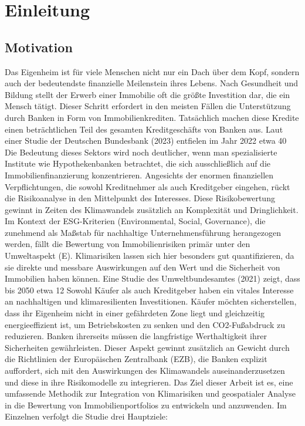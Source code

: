 \section{Einleitung}
\subsection{Motivation}

Das Eigenheim ist für viele Menschen nicht nur ein Dach über dem Kopf, sondern auch der bedeutendste finanzielle Meilenstein ihres Lebens. Nach Gesundheit und Bildung stellt der Erwerb einer Immobilie oft die größte Investition dar, die ein Mensch tätigt. Dieser Schritt erfordert in den meisten Fällen die Unterstützung durch Banken in Form von Immobilienkrediten. Tatsächlich machen diese Kredite einen beträchtlichen Teil des gesamten Kreditgeschäfts von Banken aus. Laut einer Studie der Deutschen Bundesbank (2023) entfielen im Jahr 2022 etwa 40%
Die Bedeutung dieses Sektors wird noch deutlicher, wenn man spezialisierte Institute wie Hypothekenbanken betrachtet, die sich ausschließlich auf die Immobilienfinanzierung konzentrieren. Angesichts der enormen finanziellen Verpflichtungen, die sowohl Kreditnehmer als auch Kreditgeber eingehen, rückt die Risikoanalyse in den Mittelpunkt des Interesses. Diese Risikobewertung gewinnt in Zeiten des Klimawandels zusätzlich an Komplexität und Dringlichkeit.
Im Kontext der ESG-Kriterien (Environmental, Social, Governance), die zunehmend als Maßstab für nachhaltige Unternehmensführung herangezogen werden, fällt die Bewertung von Immobilienrisiken primär unter den Umweltaspekt (E). Klimarisiken lassen sich hier besonders gut quantifizieren, da sie direkte und messbare Auswirkungen auf den Wert und die Sicherheit von Immobilien haben können. Eine Studie des Umweltbundesamtes (2021) zeigt, dass bis 2050 etwa 12%
Sowohl Käufer als auch Kreditgeber haben ein vitales Interesse an nachhaltigen und klimaresilienten Investitionen. Käufer möchten sicherstellen, dass ihr Eigenheim nicht in einer gefährdeten Zone liegt und gleichzeitig energieeffizient ist, um Betriebskosten zu senken und den CO2-Fußabdruck zu reduzieren. Banken ihrerseits müssen die langfristige Werthaltigkeit ihrer Sicherheiten gewährleisten. Dieser Aspekt gewinnt zusätzlich an Gewicht durch die Richtlinien der Europäischen Zentralbank (EZB), die Banken explizit auffordert, sich mit den Auswirkungen des Klimawandels auseinanderzusetzen und diese in ihre Risikomodelle zu integrieren.
Das Ziel dieser Arbeit ist es, eine umfassende Methodik zur Integration von Klimarisiken und geospatialer Analyse in die Bewertung von Immobilienportfolios zu entwickeln und anzuwenden. Im Einzelnen verfolgt die Studie drei Hauptziele:

